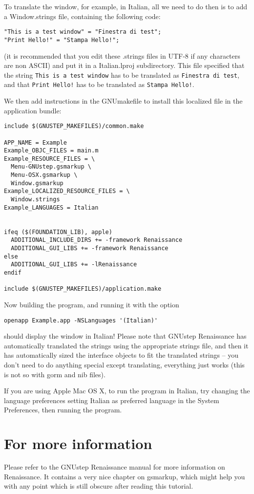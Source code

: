 \documentclass[a4paper]{article}
\begin{document}
To translate the window, for example, in Italian, all we need to do
then is to add a Window.strings file, containing the following code:
\begin{verbatim}
"This is a test window" = "Finestra di test";
"Print Hello!" = "Stampa Hello!";
\end{verbatim}
(it is recommended that you edit these .strings files in UTF-8 if any
characters are non ASCII) and put it in a Italian.lproj subdirectory.
This file specified that the string \texttt{This is a test window} has
to be translated as \texttt{Finestra di test}, and that \texttt{Print
Hello!} has to be translated as \texttt{Stampa Hello!}.

We then add instructions in the GNUmakefile to install this localized
file in the application bundle:
\begin{verbatim}
include $(GNUSTEP_MAKEFILES)/common.make

APP_NAME = Example
Example_OBJC_FILES = main.m
Example_RESOURCE_FILES = \
  Menu-GNUstep.gsmarkup \
  Menu-OSX.gsmarkup \
  Window.gsmarkup
Example_LOCALIZED_RESOURCE_FILES = \
  Window.strings
Example_LANGUAGES = Italian


ifeq ($(FOUNDATION_LIB), apple)
  ADDITIONAL_INCLUDE_DIRS += -framework Renaissance
  ADDITIONAL_GUI_LIBS += -framework Renaissance
else
  ADDITIONAL_GUI_LIBS += -lRenaissance
endif

include $(GNUSTEP_MAKEFILES)/application.make
\end{verbatim}

Now building the program, and running it with the option
\begin{verbatim}
openapp Example.app -NSLanguages '(Italian)' 
\end{verbatim}
should display the window in Italian!  Please note that GNUstep
Renaissance has automatically translated the strings using the
appropriate strings file, and then it has automatically sized the
interface objects to fit the translated strings -- you don't need to
do anything special except translating, everything just works (this is
not so with gorm and nib files).

If you are using Apple Mac OS X, to run the program in Italian, try
changing the language preferences setting Italian as preferred
language in the System Preferences, then running the program.

\section{For more information}
Please refer to the GNUstep Renaissance manual for more information on
Renaissance.  It contains a very nice chapter on gsmarkup, which might
help you with any point which is still obscure after reading this
tutorial.
\end{document}
